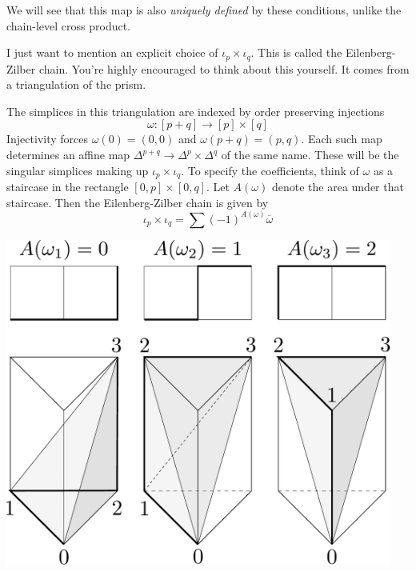 We will see that this map is also \emph{uniquely defined} by these conditions, unlike the chain-level cross product.

I just want to mention an explicit choice of $\iota_p\times\iota_q$. This is called the Eilenberg-Zilber chain. You're highly encouraged to think about this yourself. It comes from a triangulation of the prism. 

The simplices in this triangulation are indexed by order preserving injections
\[
\omega:[p+q]\to[p]\times[q]
\]
Injectivity forces $\omega(0)=(0,0)$ and $\omega(p+q)=(p,q)$. Each such map
determines an affine map $\Delta^{p+q}\to\Delta^p\times\Delta^q$ of the same name. These will be
the singular simplices making up $\iota_p\times\iota_q$. To specify the coefficients, think of $\omega$ as a staircase in the rectangle $[0,p]\times[0,q]$. 
Let $A(\omega)$ denote the area under that staircase. Then the Eilenberg-Zilber chain is given by 
\[
\iota_p\times\iota_q=\sum(-1)^{A(\omega)}\overline{\omega}
\]

\begin{center}
\includegraphics[width=5in]{905/Figures/07-EZ-triangulation.pdf}
\end{center}


